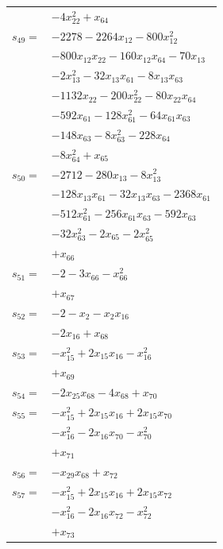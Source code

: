 \begin{longtable}{@{}r@{\;}l@{}}
 & \(\displaystyle -4x_{22}^{2} +x_{64}\) \\[3pt]
\(s_{49}=\) & \(\displaystyle -2278 -2264x_{12} -800x_{12}^{2}\) \\
 & \(\displaystyle -800x_{12}x_{22} -160x_{12}x_{64} -70x_{13}\) \\
 & \(\displaystyle -2x_{13}^{2} -32x_{13}x_{61} -8x_{13}x_{63}\) \\
 & \(\displaystyle -1132x_{22} -200x_{22}^{2} -80x_{22}x_{64}\) \\
 & \(\displaystyle -592x_{61} -128x_{61}^{2} -64x_{61}x_{63}\) \\
 & \(\displaystyle -148x_{63} -8x_{63}^{2} -228x_{64}\) \\
 & \(\displaystyle -8x_{64}^{2} +x_{65}\) \\[3pt]
\(s_{50}=\) & \(\displaystyle -2712 -280x_{13} -8x_{13}^{2}\) \\
 & \(\displaystyle -128x_{13}x_{61} -32x_{13}x_{63} -2368x_{61}\) \\
 & \(\displaystyle -512x_{61}^{2} -256x_{61}x_{63} -592x_{63}\) \\
 & \(\displaystyle -32x_{63}^{2} -2x_{65} -2x_{65}^{2}\) \\
 & \(\displaystyle +x_{66}\) \\[3pt]
\(s_{51}=\) & \(\displaystyle -2 -3x_{66} -x_{66}^{2}\) \\
 & \(\displaystyle +x_{67}\) \\[3pt]
\(s_{52}=\) & \(\displaystyle -2 -x_{2} -x_{2}x_{16}\) \\
 & \(\displaystyle -2x_{16} +x_{68}\) \\[3pt]
\(s_{53}=\) & \(\displaystyle -x_{15}^{2} +2x_{15}x_{16} -x_{16}^{2}\) \\
 & \(\displaystyle +x_{69}\) \\[3pt]
\(s_{54}=\) & \(\displaystyle -2x_{25}x_{68} -4x_{68} +x_{70}\) \\[3pt]
\(s_{55}=\) & \(\displaystyle -x_{15}^{2} +2x_{15}x_{16} +2x_{15}x_{70}\) \\
 & \(\displaystyle -x_{16}^{2} -2x_{16}x_{70} -x_{70}^{2}\) \\
 & \(\displaystyle +x_{71}\) \\[3pt]
\(s_{56}=\) & \(\displaystyle -x_{29}x_{68} +x_{72}\) \\[3pt]
\(s_{57}=\) & \(\displaystyle -x_{15}^{2} +2x_{15}x_{16} +2x_{15}x_{72}\) \\
 & \(\displaystyle -x_{16}^{2} -2x_{16}x_{72} -x_{72}^{2}\) \\
 & \(\displaystyle +x_{73}\) \\[3pt]

\end{longtable}
